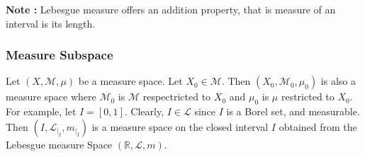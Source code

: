 	\textbf{Note : }  Lebesgue measure offers an addition property, that is measure of an interval is its length.\\

\subsubsection{Measure Subspace}
	Let $(X,\mathcal{M},\mu)$ be a measure space.
	Let $X_0 \in \mathcal{M}$.
	Then $(X_0,\mathcal{M}_0,\mu_0)$ is also a measure space where $\mathcal{M}_0$ is $\mathcal{M}$ respectricted to $X_0$ and $\mu_0$ is $\mu$ restricted to $X_0$.\\

	For example, let $I = [0,1]$.
	Clearly, $I \in \mathcal{L}$ since $I$ is a Borel set, and measurable.
	Then $(I,\mathcal{L}_{|_I},m_{|_I})$ is a measure space on the closed interval $I$ obtained from the Lebesgue measure Space $(\mathbb{R},\mathcal{L},m)$.

